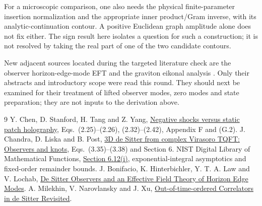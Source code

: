 \documentclass[11pt,a4paper]{article}
\begin{document}
For a microscopic comparison, one also needs the physical finite-parameter
insertion normalization and the appropriate inner product/Gram inverse,
with its analytic-continuation contour. A positive Euclidean graph
amplitude alone does not fix either. The sign result here isolates
a question for such a construction; it is not resolved by taking the
real part of one of the two candidate contours.

New adjacent sources located during the targeted literature check are
the observer horizon-edge-mode EFT \cite{edge} and the graviton
eikonal analysis \cite{mnx}. Only their abstracts and introductory
scope were read this round. They should next be examined for their
treatment of lifted observer modes, zero modes and state preparation;
they are not inputs to the derivation above.

\begin{thebibliography}{9}
 Y. Chen, D. Stanford, H. Tang and Z. Yang,
\href{https://arxiv.org/html/2607.14042v1}
{Negative shocks versus static patch holography},
Eqs.\ (2.25)--(2.26), (2.32)--(2.42), Appendix F and (G.2).
 J. Chandra, D. Liska and B. Post,
\href{https://arxiv.org/html/2610.30247v1}
{3D de Sitter from complex Virasoro TQFT: Observers and knots},
Eqs.\ (3.35)--(3.38) and Section 6.
 NIST Digital Library of Mathematical Functions,
\href{https://dlmf.nist.gov/6.12}{Section 6.12(i)},
exponential-integral asymptotics and fixed-order remainder bounds.
 J. Bonifacio, K. Hinterbichler, Y. T. A. Law and V. Lochab,
\href{https://arxiv.org/html/2610.28719v1}
{De Sitter Observers and an Effective Field Theory of Horizon Edge Modes}.
 A. Milekhin, V. Narovlansky and J. Xu,
\href{https://arxiv.org/html/2607.13137v1}
{Out-of-time-ordered Correlators in de Sitter Revisited}.
\end{thebibliography}
\end{document}
